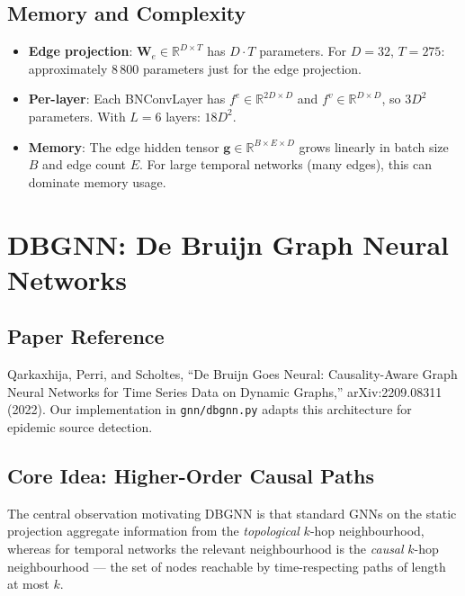 \documentclass[12pt,a4paper]{report}
\newcommand{\R}{\mathbb{R}}
\newcommand{\bg}{\mathbf{g}}
\newcommand{\bW}{\mathbf{W}}
\begin{document}
\section{Memory and Complexity}

\begin{itemize}[noitemsep]
  \item \textbf{Edge projection}: $\bW_e \in \R^{D \times T}$ has $D \cdot T$
    parameters. For $D=32$, $T=275$: approximately 8\,800 parameters just for
    the edge projection.
  \item \textbf{Per-layer}: Each BNConvLayer has $f^e \in \R^{2D \times D}$ and
    $f^v \in \R^{D \times D}$, so $3D^2$ parameters. With $L=6$ layers: $18D^2$.
  \item \textbf{Memory}: The edge hidden tensor $\bg \in \R^{B \times E \times D}$
    grows linearly in batch size $B$ and edge count $E$. For large temporal
    networks (many edges), this can dominate memory usage.
\end{itemize}

\chapter{DBGNN: De Bruijn Graph Neural Networks}
\label{chap:dbgnn}

\section{Paper Reference}

Qarkaxhija, Perri, and Scholtes, ``De Bruijn Goes Neural: Causality-Aware
Graph Neural Networks for Time Series Data on Dynamic Graphs,''
arXiv:2209.08311 (2022). Our implementation in \texttt{gnn/dbgnn.py} adapts
this architecture for epidemic source detection.

\section{Core Idea: Higher-Order Causal Paths}

The central observation motivating DBGNN is that standard GNNs on the static
projection aggregate information from the \emph{topological} $k$-hop
neighbourhood, whereas for temporal networks the relevant neighbourhood is the
\emph{causal} $k$-hop neighbourhood — the set of nodes reachable by
time-respecting paths of length at most $k$.
\end{document}
